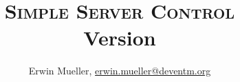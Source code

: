 \setlength{\parskip}{1ex plus 0.5ex minus 0.2ex}

\title{\textsc{Simple Server Control}
\\
\normalsize{Version \softwareversion}}

\author{Erwin Mueller, \url{erwin.mueller@deventm.org}}

\renewcommand{\versionshistory}{
  \begin{tabular*}{0.8\textwidth}{llp{3cm}p{4cm}}
  Version & Date & Author & Changes \\
  \toprule
  0.1 & 2011-09-04 & Erwin Müller & Erste Version der Zielbestimmungen. \\
  \end{tabular*}
}

\newcommand{\sscontrol}{\textit{Simple Server Control}}
\newcommand{\parameter}[1]{``\texttt{#1}'' Parameter}
\newcommand{\directive}[1]{``\texttt{#1}'' Direktive}
\newcommand{\variable}[1]{``\texttt{#1}'' Variable}

\newcommand{\softwarename}{\textit{FDS Keys Command Line}}
\newcommand{\softwareversion}{0.8}
